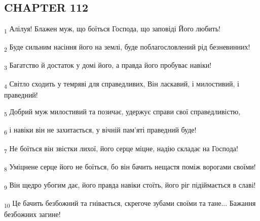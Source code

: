 \subsection{CHAPTER 112}
\begin{tcolorbox}
\textsubscript{1} Алілуя! Блажен муж, що боїться Господа, що заповіді Його любить!
\end{tcolorbox}
\begin{tcolorbox}
\textsubscript{2} Буде сильним насіння його на землі, буде поблагословлений рід безневинних!
\end{tcolorbox}
\begin{tcolorbox}
\textsubscript{3} Багатство й достаток у домі його, а правда його пробуває навіки!
\end{tcolorbox}
\begin{tcolorbox}
\textsubscript{4} Світло сходить у темряві для справедливих, Він ласкавий, і милостивий, і праведний!
\end{tcolorbox}
\begin{tcolorbox}
\textsubscript{5} Добрий муж милостивий та позичає, удержує справи свої справедливістю,
\end{tcolorbox}
\begin{tcolorbox}
\textsubscript{6} і навіки він не захитається, у вічній пам'яті праведний буде!
\end{tcolorbox}
\begin{tcolorbox}
\textsubscript{7} Не боїться він звістки лихої, його серце міцне, надію складає на Господа!
\end{tcolorbox}
\begin{tcolorbox}
\textsubscript{8} Уміцнене серце його не боїться, бо він бачить нещастя поміж ворогами своїми!
\end{tcolorbox}
\begin{tcolorbox}
\textsubscript{9} Він щедро убогим дає, його правда навіки стоїть, його ріг підіймається в славі!
\end{tcolorbox}
\begin{tcolorbox}
\textsubscript{10} Це бачить безбожний та гнівається, скрегоче зубами своїми та тане... Бажання безбожних загине!
\end{tcolorbox}
